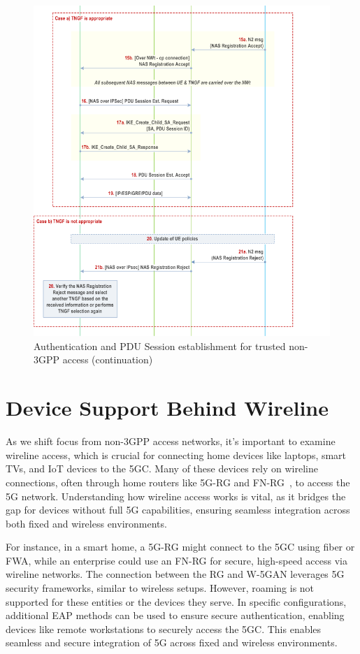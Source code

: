 \begin{figure}
    \centering
    \includegraphics[width=0.75\linewidth]{figs/Authentication and PDU Session establishment for trusted non-3GPP access_3.png}
    \caption{Authentication and \ac{PDU} Session establishment for trusted non-\ac{3GPP} access (continuation)}
    \label{fig:Authentication and PDU Session establishment for trusted non-3GPP access_3}
\end{figure}

\section{Device Support Behind Wireline}

As we shift focus from non-\ac{3GPP} access networks, it’s important to examine wireline access, which is crucial for connecting home devices like laptops, smart TVs, and \ac{IoT} devices to the \ac{5GC}. Many of these devices rely on wireline connections, often through home routers like \ac{5G-RG} and \ac{FN-RG}~\cite{33.501-p139}, to access the \ac{5G} network. Understanding how wireline access works is vital, as it bridges the gap for devices without full \ac{5G} capabilities, ensuring seamless integration across both fixed and wireless environments.

For instance, in a smart home, a \ac{5G-RG} might connect to the \ac{5GC} using fiber or \ac{FWA}, while an enterprise could use an \ac{FN-RG} for secure, high-speed access via wireline networks. The connection between the \ac{RG} and \ac{W-5GAN} leverages \ac{5G} security frameworks, similar to wireless setups. However, roaming is not supported for these entities or the devices they serve. In specific configurations, additional \ac{EAP} methods can be used to ensure secure authentication, enabling devices like remote workstations to securely access the \ac{5GC}. This enables seamless and secure integration of \ac{5G} across fixed and wireless environments.

